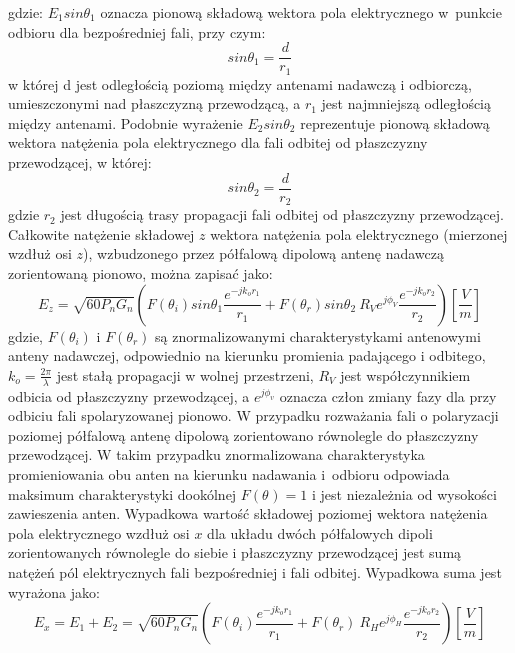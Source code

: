 gdzie: $E_1sin\theta_1$ oznacza pionową składową wektora pola elektrycznego w~punkcie odbioru dla bezpośredniej fali, przy czym: 
\begin{equation} \label{eq:17_13}
    sin\theta_{1}  =\frac{d}{r_{1}}
\end{equation}
w której d jest odległością poziomą między antenami nadawczą i odbiorczą, umieszczonymi nad płaszczyzną przewodzącą, a $r_1$ jest najmniejszą odległością między antenami.
Podobnie wyrażenie $E_2sin\theta_2$ reprezentuje pionową składową wektora natężenia pola elektrycznego dla fali odbitej od płaszczyzny przewodzącej, w której:
\begin{equation} \label{eq:17_14}
     sin\theta_{2}  =\frac{d}{r_{2}}
\end{equation}
gdzie $r_2$ jest długością trasy propagacji fali odbitej od płaszczyzny przewodzącej. 
Całkowite natężenie składowej $z$ wektora natężenia pola elektrycznego (mierzonej wzdłuż osi $z$), wzbudzonego przez  półfalową dipolową antenę  nadawczą zorientowaną pionowo, można zapisać jako:
\begin{equation} \label{eq:17_15}\scriptstyle
    E_{z}=\sqrt{60P_{n}G_{n}} (F(\theta_{i}) sin\theta_{1}\frac{e^{-jk_{o}r_{1}}}{r_{1}}+F(\theta_{r})sin\theta_{2}\ R_{V} e^{j\phi_V}\frac{e^{-jk_{o}r_{2}}}{r_{2}})\left[ \frac{V}{m} \right]
\end{equation}
gdzie, $F(\theta_{i} )$  i $F(\theta_{r} )$ są znormalizowanymi charakterystykami antenowymi anteny nadawczej, odpowiednio na kierunku promienia padającego i odbitego, $k_{o}=\frac{2\pi}{\lambda}$ jest stałą propagacji w wolnej przestrzeni, $R_{V}$  jest współczynnikiem odbicia od płaszczyzny przewodzącej, a $e^{j\phi_{v} }$ oznacza człon zmiany fazy dla przy odbiciu fali spolaryzowanej pionowo.
W przypadku rozważania fali o polaryzacji poziomej półfalową antenę dipolową zorientowano równolegle do płaszczyzny przewodzącej. W takim przypadku znormalizowana charakterystyka promieniowania obu anten na kierunku nadawania i~odbioru odpowiada maksimum charakterystyki dookólnej $F(\theta_{} ) =1$ i jest niezależnia od wysokości zawieszenia anten. Wypadkowa wartość składowej poziomej wektora natężenia pola elektrycznego wzdłuż osi $x$ dla układu dwóch półfalowych dipoli zorientowanych równolegle do siebie i płaszczyzny przewodzącej jest sumą natężeń pól elektrycznych fali bezpośredniej i fali odbitej. Wypadkowa suma jest wyrażona jako:
\begin{equation} \label{eq:17_16}\scriptstyle
    E_{x}=E_{1}+E_{2}=\sqrt{60P_{n}G_{n}} (F(\theta_{i}) \frac{e^{-jk_{o}r_{1}}}{r_{1}} +F(\theta_{r})\ R_{H}e^{j\phi_ H}\frac{e^{-jk_{o}r_{2}}}{r_{2}})\left[ \frac{V}{m} \right]
\end{equation}
